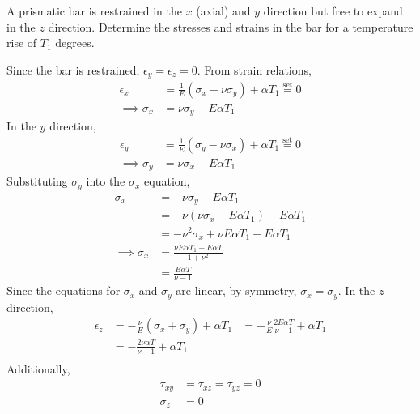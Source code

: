 \section{}
A prismatic bar is restrained in the $x$ (axial) and $y$ direction but free to expand in the $z$ direction. Determine
the stresses and strains in the bar for a temperature rise of $T_1$ degrees.

Since the bar is restrained, $\epsilon_y = \epsilon_z = 0$. From strain relations,
\begin{align*}
    \epsilon_x &= \frac{1}{E} \left( \sigma_x - \nu \sigma_y \right) + \alpha T_1 \overset{\text{set}}{=} 0 \\
    \implies \sigma_x &= \nu \sigma_y - E \alpha T_1
\end{align*}
In the $y$ direction,
\begin{align*}
    \epsilon_y &= \frac{1}{E} \left( \sigma_y - \nu \sigma_x \right) + \alpha T_1 \overset{\text{set}}{=} 0 \\
    \implies \sigma_y &= \nu \sigma_x - E \alpha T_1
\end{align*}
Substituting $\sigma_y$ into the $\sigma_x$ equation,
\begin{align*}
    \sigma_x &= -\nu \sigma_y - E \alpha T_1 \\
    &= -\nu (\nu \sigma_x - E \alpha T_1) - E \alpha T_1 \\
    &= -\nu^2 \sigma_x + \nu E \alpha T_1- E \alpha T_1\\
    \implies \sigma_x &= \frac{\nu E \alpha T_1- E \alpha T}{1 + \nu^2} \\
    &= \frac{E \alpha T}{\nu - 1}
\end{align*}
Since the equations for $\sigma_x$ and $\sigma_y$ are linear, by symmetry, $\sigma_x = \sigma_y$. 
In the $z$ direction,
\begin{align*}
    \epsilon_z &= -\frac{\nu}{E} \left( \sigma_x + \sigma_y \right) + \alpha T_1
    &= -\frac{\nu}{E}\frac{2E \alpha T}{\nu - 1} + \alpha T_1\\
    &= -\frac{2\nu \alpha T}{\nu - 1} + \alpha T_1\\
\end{align*}
Additionally,
\begin{align*}
    \tau_{xy} &= \tau_{xz} = \tau_{yz} = 0 \\
    \sigma_{z} &= 0
\end{align*}
